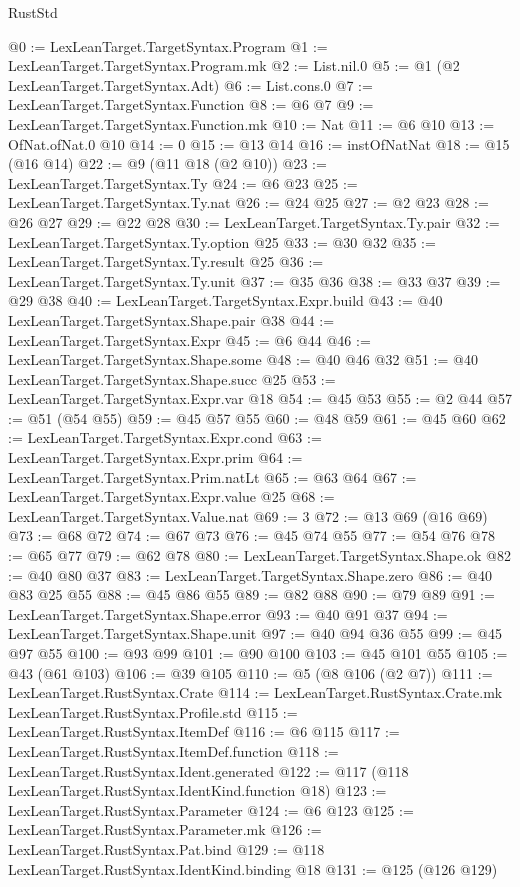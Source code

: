 \begin{lexlean}{RustStd}
\begin{coremodule}
@0 := LexLeanTarget.TargetSyntax.Program
@1 := LexLeanTarget.TargetSyntax.Program.mk
@2 := List.nil.{0}
@5 := @1 (@2 LexLeanTarget.TargetSyntax.Adt)
@6 := List.cons.{0}
@7 := LexLeanTarget.TargetSyntax.Function
@8 := @6 @7
@9 := LexLeanTarget.TargetSyntax.Function.mk
@10 := Nat
@11 := @6 @10
@13 := OfNat.ofNat.{0} @10
@14 := 0
@15 := @13 @14
@16 := instOfNatNat
@18 := @15 (@16 @14)
@22 := @9 (@11 @18 (@2 @10))
@23 := LexLeanTarget.TargetSyntax.Ty
@24 := @6 @23
@25 := LexLeanTarget.TargetSyntax.Ty.nat
@26 := @24 @25
@27 := @2 @23
@28 := @26 @27
@29 := @22 @28
@30 := LexLeanTarget.TargetSyntax.Ty.pair
@32 := LexLeanTarget.TargetSyntax.Ty.option @25
@33 := @30 @32
@35 := LexLeanTarget.TargetSyntax.Ty.result @25
@36 := LexLeanTarget.TargetSyntax.Ty.unit
@37 := @35 @36
@38 := @33 @37
@39 := @29 @38
@40 := LexLeanTarget.TargetSyntax.Expr.build
@43 := @40 LexLeanTarget.TargetSyntax.Shape.pair @38
@44 := LexLeanTarget.TargetSyntax.Expr
@45 := @6 @44
@46 := LexLeanTarget.TargetSyntax.Shape.some
@48 := @40 @46 @32
@51 := @40 LexLeanTarget.TargetSyntax.Shape.succ @25
@53 := LexLeanTarget.TargetSyntax.Expr.var @18
@54 := @45 @53
@55 := @2 @44
@57 := @51 (@54 @55)
@59 := @45 @57 @55
@60 := @48 @59
@61 := @45 @60
@62 := LexLeanTarget.TargetSyntax.Expr.cond
@63 := LexLeanTarget.TargetSyntax.Expr.prim
@64 := LexLeanTarget.TargetSyntax.Prim.natLt
@65 := @63 @64
@67 := LexLeanTarget.TargetSyntax.Expr.value @25
@68 := LexLeanTarget.TargetSyntax.Value.nat
@69 := 3
@72 := @13 @69 (@16 @69)
@73 := @68 @72
@74 := @67 @73
@76 := @45 @74 @55
@77 := @54 @76
@78 := @65 @77
@79 := @62 @78
@80 := LexLeanTarget.TargetSyntax.Shape.ok
@82 := @40 @80 @37
@83 := LexLeanTarget.TargetSyntax.Shape.zero
@86 := @40 @83 @25 @55
@88 := @45 @86 @55
@89 := @82 @88
@90 := @79 @89
@91 := LexLeanTarget.TargetSyntax.Shape.error
@93 := @40 @91 @37
@94 := LexLeanTarget.TargetSyntax.Shape.unit
@97 := @40 @94 @36 @55
@99 := @45 @97 @55
@100 := @93 @99
@101 := @90 @100
@103 := @45 @101 @55
@105 := @43 (@61 @103)
@106 := @39 @105
@110 := @5 (@8 @106 (@2 @7))
@111 := LexLeanTarget.RustSyntax.Crate
@114 := LexLeanTarget.RustSyntax.Crate.mk LexLeanTarget.RustSyntax.Profile.std
@115 := LexLeanTarget.RustSyntax.ItemDef
@116 := @6 @115
@117 := LexLeanTarget.RustSyntax.ItemDef.function
@118 := LexLeanTarget.RustSyntax.Ident.generated
@122 := @117 (@118 LexLeanTarget.RustSyntax.IdentKind.function @18)
@123 := LexLeanTarget.RustSyntax.Parameter
@124 := @6 @123
@125 := LexLeanTarget.RustSyntax.Parameter.mk
@126 := LexLeanTarget.RustSyntax.Pat.bind
@129 := @118 LexLeanTarget.RustSyntax.IdentKind.binding @18
@131 := @125 (@126 @129)

\end{coremodule}
\end{lexlean}
